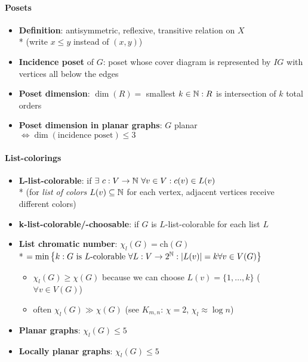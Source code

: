 \paragraph{Posets}
\begin{itemize}
  \item \textbf{Definition}: antisymmetric, reflexive, transitive relation on $ X $ \\* (write $ x \leq y $ instead of $ (x,y) $) 
  \item \textbf{Incidence poset} of $ G $: poset whose cover diagram is represented by $ IG $ with vertices all below the edges
  \item \textbf{Poset dimension}: $ \dim(R) = $ smallest $ k \in \mathbb{N} : R $ is intersection of $ k $ total orders
  \item \textbf{Poset dimension in planar graphs}: $ G $ planar $ \Leftrightarrow \dim(\text{incidence poset}) \leq 3 $
\end{itemize}

\paragraph{List-colorings}
\begin{itemize}
  \item \textbf{L-list-colorable}: if $ \exists \ c: V \to \mathbb{N} \ \forall v \in V : c(v) \in L(v) $ \\*
  (for \emph{list of colors} $ L(v) \subseteq \mathbb{N} $ for each vertex, adjacent vertices receive different colors) 
  \item \textbf{k-list-colorable/-choosable}: if $ G $ is $ L $-list-colorable for each list $ L $
  \item \textbf{List chromatic number}: $ \chi_l(G) = \text{ch}(G) $ \\* $ = \min\left\{ k : G \text{ is $ L $-colorable } \forall L: V \to 2^{\mathbb{N}}: \vert L(v) \vert = k \forall v \in V(G) \right\} $
  \begin{itemize}
    \item $ \chi_l(G) \geq \chi(G) $ because we can choose $ L(v) = \{ 1, \dots, k \} $ ($ \forall v \in V(G) $) 
    \item often $ \chi_l(G) \gg \chi(G) $ (see $ K_{m,n} $: $ \chi = 2 $, $ \chi_l \approx \log n $)
  \end{itemize}
  \item \textbf{Planar graphs}: $ \chi_l(G) \leq 5 $
  \item \textbf{Locally planar graphs}: $ \chi_l(G) \leq 5 $
\end{itemize}
